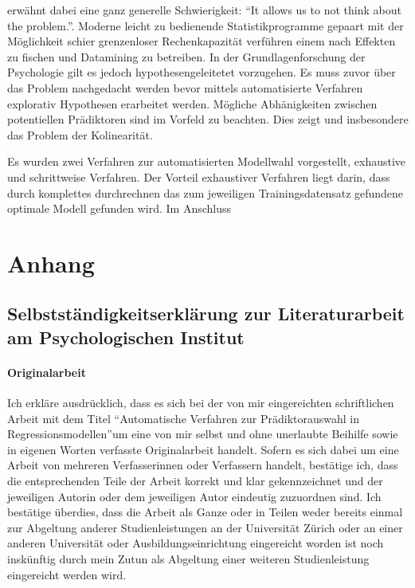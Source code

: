 \documentclass[english,12pt,doc]{apa}
\begin{document}
 erwähnt dabei eine ganz generelle Schwierigkeit: ``It allows us to not think about the problem.''.
Moderne leicht zu bedienende Statistikprogramme gepaart mit der Möglichkeit schier grenzenloser Rechenkapazität verführen einem nach Effekten zu fischen und Datamining zu betreiben.
In der Grundlagenforschung der Psychologie gilt es jedoch hypothesengeleitetet vorzugehen.
Es muss zuvor über das Problem nachgedacht werden bevor mittels automatisierte Verfahren explorativ Hypothesen erarbeitet werden.
Mögliche Abhänigkeiten zwischen potentiellen Prädiktoren sind im Vorfeld zu beachten.
Dies zeigt und insbesondere das Problem der Kolinearität.

Es wurden zwei Verfahren zur automatisierten Modellwahl vorgestellt, exhaustive und schrittweise Verfahren.
Der Vorteil exhaustiver Verfahren liegt darin, dass durch komplettes durchrechnen das zum jeweiligen Trainingsdatensatz gefundene optimale Modell gefunden wird.
Im Anschluss 



\newpage
\printglossaries 
\newpage
 

\newpage
\section{Anhang}
\subsection*{Selbstständigkeitserklärung zur Literaturarbeit am  Psychologischen Institut}
\paragraph{Originalarbeit}
Ich erkläre ausdrücklich, dass es sich bei der von mir eingereichten schriftlichen Arbeit 
mit dem Titel ``Automatische Verfahren zur Prädiktorauswahl in Regressionsmodellen''um eine von mir selbst und ohne unerlaubte Beihilfe sowie in eigenen Worten verfasste 
Originalarbeit handelt. 
Sofern es sich dabei um eine Arbeit von mehreren Verfasserinnen oder Verfassern handelt, bestätige ich, dass die entsprechenden Teile der Arbeit korrekt und klar gekennzeichnet und der jeweiligen Autorin oder dem jeweiligen Autor eindeutig zuzuordnen sind.
Ich bestätige überdies, dass die Arbeit als Ganze oder in Teilen weder bereits einmal zur Abgeltung anderer Studienleistungen an der Universität Zürich oder an einer anderen Universität oder Ausbildungseinrichtung eingereicht worden ist noch inskünftig durch mein Zutun als Abgeltung einer weiteren Studienleistung eingereicht werden wird.  
\end{document}
